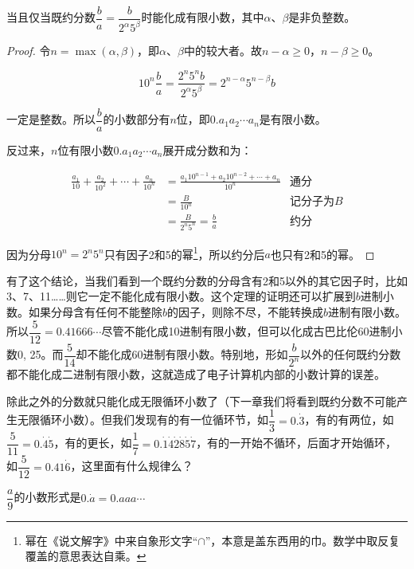 \documentclass[b5paper]{ctexart}
\begin{document}
\begin{theorem} \label{thm:finite-decimal}
  当且仅当既约分数$\dfrac{b}{a} = \dfrac{b}{2^{\alpha}5^{\beta}}$时能化成有限小数，其中$\alpha$、$\beta$是非负整数。
\end{theorem}

\begin{proof}
令$n = \max(\alpha, \beta)$，即$\alpha$、$\beta$中的较大者。故$n - \alpha \geq 0$，$n - \beta \geq 0$。

\[
10^n \frac{b}{a} = \frac{2^n 5^n b}{2^{\alpha} 5^{\beta}} = 2^{n - \alpha} 5 ^{n - \beta} b
\]

一定是整数。所以$\dfrac{b}{a}$的小数部分有$n$位，即$0.a_1 a_2 \cdots a_n$是有限小数。

反过来，$n$位有限小数$0.a_1 a_2 \cdots a_n$展开成分数和为：

\begin{align*}
\frac{a_1}{10} + \frac{a_2}{10^2} + \cdots + \frac{a_n}{10^n} &= \frac{a_1 10^{n-1} + a_2 10^{n-2} + \cdots + a_n}{10^n} & \text{通分} \\
  &= \frac{B}{10^n} & \text{记分子为}B \\
  &= \frac{B}{2^n 5^n} = \frac{b}{a} & \text{约分}
\end{align*}

因为分母$10^n = 2^n 5^n$只有因子2和5的幂\footnote{幂在《说文解字》中来自象形文字“$\cap$”，本意是盖东西用的巾。数学中取反复覆盖的意思表达自乘。}，所以约分后$a$也只有2和5的幂。
\end{proof}

有了这个结论，当我们看到一个既约分数的分母含有2和5以外的其它因子时，比如3、7、11……则它一定不能化成有限小数。这个定理的证明还可以扩展到$b$进制小数。如果分母含有任何不能整除$b$的因子，则除不尽，不能转换成$b$进制有限小数。所以$\dfrac{5}{12} = 0.41666\cdots$尽管不能化成10进制有限小数，但可以化成古巴比伦60进制小数0, 25。而$\dfrac{5}{14}$却不能化成60进制有限小数。特别地，形如$\dfrac{b}{2^n}$以外的任何既约分数都不能化成二进制有限小数，这就造成了电子计算机内部的小数计算的误差。

除此之外的分数就只能化成无限循环小数了（下一章我们将看到既约分数不可能产生无限循环小数）。但我们发现有的有一位循环节，如$\dfrac{1}{3} = 0.\dot{3}$，有的有两位，如$\dfrac{5}{11} = 0.\dot{4}\dot{5}$，有的更长，如$\dfrac{1}{7} = 0.\dot{1}\dot{4}\dot{2}\dot{8}\dot{5}\dot{7}$，有的一开始不循环，后面才开始循环，如$\dfrac{5}{12} = 0.41\dot{6}$，这里面有什么规律么？

\begin{proposition}
$\dfrac{a}{9}$的小数形式是$0.\dot{a} = 0.aaa\cdots$
\end{proposition}
\end{document}
